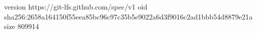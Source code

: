 version https://git-lfs.github.com/spec/v1
oid sha256:2658a164150f55eea85bc96c97c35b5e9022a6d3f9016c2ad1bbb54d8879e21a
size 809914
